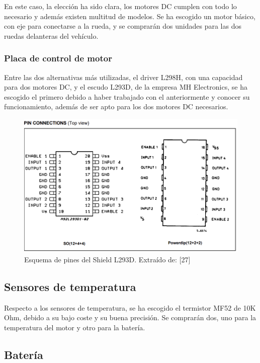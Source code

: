  En este caso, la elección ha sido clara, los motores DC cumplen con todo lo necesario y además existen multitud de modelos. 
 Se ha escogido un motor básico, con eje para conectarse a la rueda, y se comprarán dos unidades para las dos ruedas delanteras del vehículo. 

 \subsubsection{Placa de control de motor}

 Entre las dos alternativas más utilizadas, el driver L298H, con una capacidad para dos motores DC, y el escudo L293D, de la empresa MH Electronics, se ha escogido el primero debido a haber trabajado con el anteriormente y conocer su funcionamiento, además de ser apto para los dos motores DC necesarios. 

 \begin{figure}[H]
  \centering
  \includegraphics[width=1\textwidth]{imagenes/pinout_L293D.png}
  \caption{Esquema de pines del Shield L293D. Extraído de: [27]}
\end{figure}

 \subsection{Sensores de temperatura}

 Respecto a los sensores de temperatura, se ha escogido el termistor MF52 de 10K Ohm, debido a su bajo coste y su buena precisión.
 Se comprarán dos, uno para la temperatura del motor y otro para la batería.

 \subsection{Batería}

